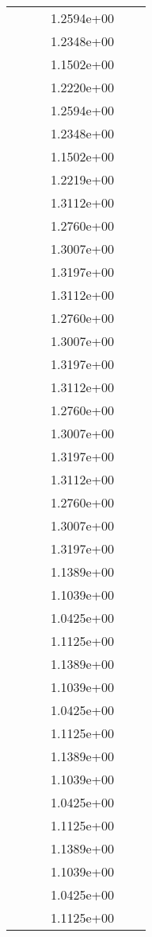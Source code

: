 \begin{xltabular}{\textwidth}{r|rS[table-format=1.3e+2]S[table-format=1.4e+2]S[table-format=1.4e+2]S[table-format=-1.5]}
&  &  & 1.2594e+00 & & \\
&  &  & 1.2348e+00 & & \\
&  &  & 1.1502e+00 & & \\
&  &  & 1.2220e+00 & & \\
&  &  & 1.2594e+00 & & \\
&  &  & 1.2348e+00 & & \\
&  &  & 1.1502e+00 & & \\
&  &  & 1.2219e+00 & & \\
&  &  & 1.3112e+00 & & \\
&  &  & 1.2760e+00 & & \\
&  &  & 1.3007e+00 & & \\
&  &  & 1.3197e+00 & & \\
&  &  & 1.3112e+00 & & \\
&  &  & 1.2760e+00 & & \\
&  &  & 1.3007e+00 & & \\
&  &  & 1.3197e+00 & & \\
&  &  & 1.3112e+00 & & \\
&  &  & 1.2760e+00 & & \\
&  &  & 1.3007e+00 & & \\
&  &  & 1.3197e+00 & & \\
&  &  & 1.3112e+00 & & \\
&  &  & 1.2760e+00 & & \\
&  &  & 1.3007e+00 & & \\
&  &  & 1.3197e+00 & & \\
&  &  & 1.1389e+00 & & \\
&  &  & 1.1039e+00 & & \\
&  &  & 1.0425e+00 & & \\
&  &  & 1.1125e+00 & & \\
&  &  & 1.1389e+00 & & \\
&  &  & 1.1039e+00 & & \\
&  &  & 1.0425e+00 & & \\
&  &  & 1.1125e+00 & & \\
&  &  & 1.1389e+00 & & \\
&  &  & 1.1039e+00 & & \\
&  &  & 1.0425e+00 & & \\
&  &  & 1.1125e+00 & & \\
&  &  & 1.1389e+00 & & \\
&  &  & 1.1039e+00 & & \\
&  &  & 1.0425e+00 & & \\
&  &  & 1.1125e+00 & & \\

\end{xltabular}
